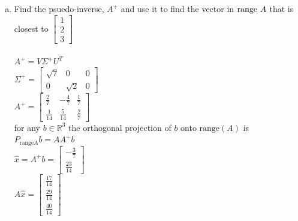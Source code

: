 \documentclass{article}
\begin{document}
{{\begin{enumerate}
\begin{enumerate}[a.]
\\$A=U\Sigma V^T$
\\
\item Find the psuedo-inverse, $A^+$ and use it to find the vector in ${\rm range}~A$ that is closest to $\left[
\begin{array}{c}
1\\
2\\
3
\end{array}\right]$
\\
\\$A^+=V\Sigma^+U^T$
\\$\Sigma^+=\left[\begin{array}{ccc} \sqrt{7} & 0 & 0 \\ 0 & \sqrt{2} & 0 \end{array}\right]$
\\$A^+=\left[\begin{array}{ccc} \frac{2}{7} & -\frac{4}{7} & \frac{1}{7} \\ \frac{1}{14} & \frac{5}{14} & \frac{2}{7} \end{array}\right]$
\\for any $b\in\mathbb{R}^3$ the orthogonal projection of $b$ onto $\textrm{range}(A)$ is $P_{\textrm{range}A}b=AA^+b$
\\$\hat{x}=A^+b=\left[\begin{array}{c} -\frac{3}{7} \\ \frac{23}{14} \end{array}\right]$
\\$A\hat{x}=\left[\begin{array}{c} \frac{17}{14} \\ \frac{29}{14} \\ \frac{40}{14} \end{array}\right]$

\end{enumerate}



\end{enumerate}}}
\end{document}
